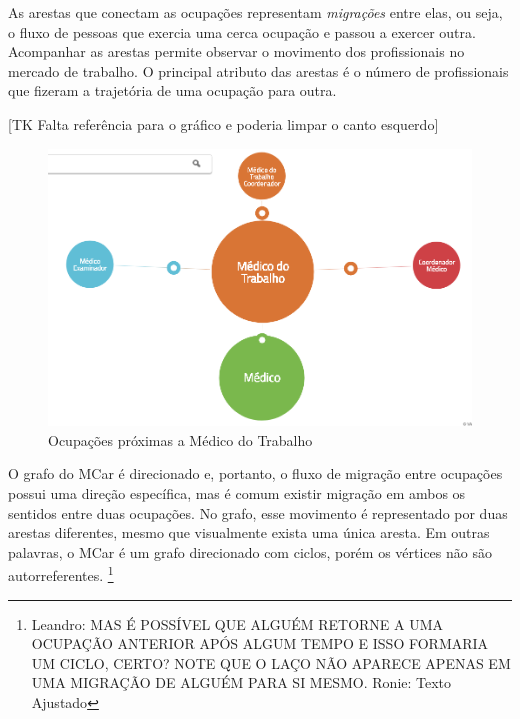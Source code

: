 \documentclass[12pt,a4paper]{article}
\begin{document}
As arestas que conectam as ocupações representam \emph{migrações} entre elas, ou seja, o fluxo de pessoas que exercia uma cerca ocupação e passou a exercer outra. Acompanhar as arestas permite observar o movimento dos profissionais no mercado de trabalho. O principal atributo das arestas é o número de profissionais que fizeram a trajetória de uma ocupação para outra.

[TK Falta referência para o gráfico e poderia limpar o canto esquerdo]

\begin{figure}[ht]
  \centering
  \includegraphics[scale=0.3]{Grafo_Medico_do_Trabalho.png}
  \caption{Ocupações próximas a Médico do Trabalho}
  \label{fig:exemplo-medico-do-trabalho}
\end{figure}

O grafo do MCar é direcionado e, portanto, o fluxo de migração entre ocupações possui uma direção específica, mas é comum existir migração em ambos os sentidos entre duas ocupações. No grafo, esse movimento é representado por duas arestas diferentes, mesmo que visualmente exista uma única aresta. Em outras palavras, o MCar é um grafo direcionado com ciclos, porém os vértices não são autorreferentes. \footnote{Leandro: MAS É POSSÍVEL QUE ALGUÉM RETORNE A UMA OCUPAÇÃO ANTERIOR APÓS ALGUM TEMPO E ISSO FORMARIA UM CICLO, CERTO? NOTE QUE O LAÇO NÃO APARECE APENAS EM UMA MIGRAÇÃO DE ALGUÉM PARA SI MESMO. Ronie: Texto Ajustado}
\end{document}
